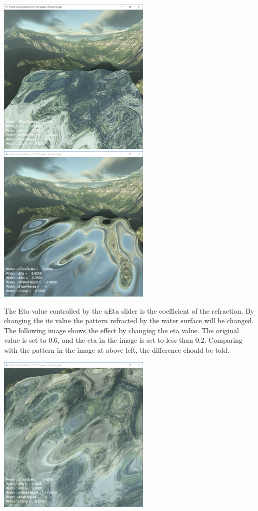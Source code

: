 \documentclass[letterpaper,14pt,titlepage,fleqn]{article}
\begin{document}
\begin{center}
	\includegraphics[width=2.9in]{refr.jpg}
	\includegraphics[width=2.9in]{refl.jpg}
\end{center}
The Eta value controlled by the uEta slider is the coefficient of the refraction. By changing the its value the pattern refracted by the water surface will be changed. The following image shows the effect by changing the eta value. The original value is set to 0.6, and the eta in the image is set to less than 0.2. Comparing with the pattern in the image at above left, the difference chould be told.
\begin{center}
	\includegraphics[width=2.9in]{eta.jpg}
\end{center}
\end{document}
